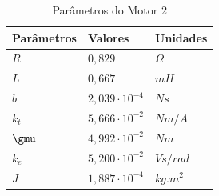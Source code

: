 \documentclass[]{politex}
\begin{document}
\begin{table}[H] 
\centering
\caption{Parâmetros do Motor 2}
\label{parametrosMotor2}
\begin{tabular}{l|l|l}
Parâmetros & Valores               & Unidades   \\ \hline
$R$        & $0{,}829$               & $\Omega$   \\
$L$        & $0{,}667$               & $mH$       \\
$b$        & $2{,}039 \cdot 10^{-4}$ & $N s$      \\
$k_{t}$    & $5{,}666 \cdot 10^{-2}$ & $Nm/A$     \\
$\gmu$     & $4{,}992 \cdot 10^{-2}$ & $Nm$        \\
$k_{e}$    & $5{,}200 \cdot 10^{-2}$ & $V s/rad$  \\
$J$        & $1{,}887 \cdot10^{-4}$  & $kg.m^{2}$
\end{tabular}
\end{table}

%

\end{document}
